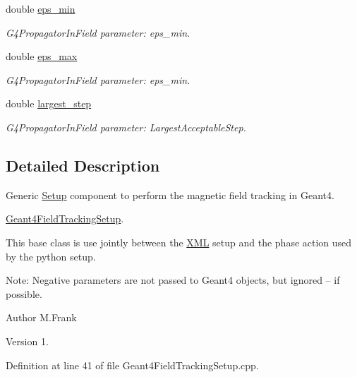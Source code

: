 \begin{DoxyCompactItemize}
double \hyperlink{struct_d_d4hep_1_1_simulation_1_1_geant4_field_tracking_setup_afc80b1b5d836629561e474b3f2e501e5}{eps\+\_\+min}
\begin{DoxyCompactList}\small\item\em G4\+Propagator\+In\+Field parameter\+: eps\+\_\+min. \end{DoxyCompactList}\item 
double \hyperlink{struct_d_d4hep_1_1_simulation_1_1_geant4_field_tracking_setup_a1402c7ed2e3696d92cd8a97b48d175bf}{eps\+\_\+max}
\begin{DoxyCompactList}\small\item\em G4\+Propagator\+In\+Field parameter\+: eps\+\_\+min. \end{DoxyCompactList}\item 
double \hyperlink{struct_d_d4hep_1_1_simulation_1_1_geant4_field_tracking_setup_a24ad8216cbc0b9c7991c9818a527fb76}{largest\+\_\+step}
\begin{DoxyCompactList}\small\item\em G4\+Propagator\+In\+Field parameter\+: Largest\+Acceptable\+Step. \end{DoxyCompactList}\end{DoxyCompactItemize}


\subsection{Detailed Description}
Generic \hyperlink{namespace_d_d4hep_1_1_simulation_1_1_setup}{Setup} component to perform the magnetic field tracking in Geant4. 

\hyperlink{struct_d_d4hep_1_1_simulation_1_1_geant4_field_tracking_setup}{Geant4\+Field\+Tracking\+Setup}.

This base class is use jointly between the \hyperlink{namespace_d_d4hep_1_1_x_m_l}{X\+ML} setup and the phase action used by the python setup.

Note\+: Negative parameters are not passed to Geant4 objects, but ignored -- if possible.

\begin{DoxyAuthor}{Author}
M.\+Frank 
\end{DoxyAuthor}
\begin{DoxyVersion}{Version}
1. 
\end{DoxyVersion}


Definition at line 41 of file Geant4\+Field\+Tracking\+Setup.\+cpp.



